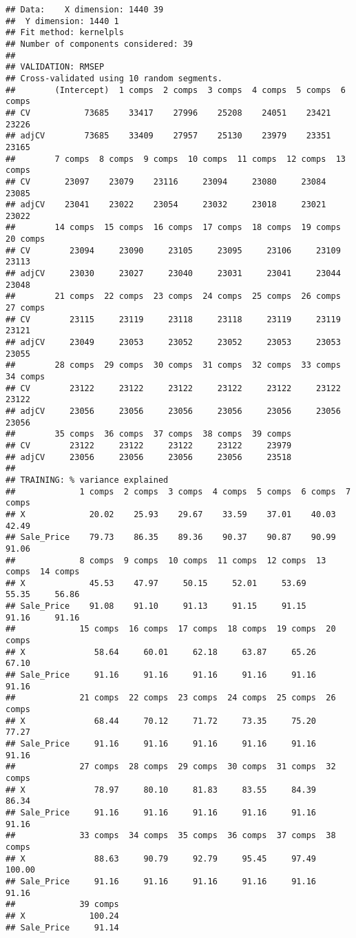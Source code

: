 \documentclass[
]{article}
\begin{document}
\begin{verbatim}
## Data:    X dimension: 1440 39 
##  Y dimension: 1440 1
## Fit method: kernelpls
## Number of components considered: 39
## 
## VALIDATION: RMSEP
## Cross-validated using 10 random segments.
##        (Intercept)  1 comps  2 comps  3 comps  4 comps  5 comps  6 comps
## CV           73685    33417    27996    25208    24051    23421    23226
## adjCV        73685    33409    27957    25130    23979    23351    23165
##        7 comps  8 comps  9 comps  10 comps  11 comps  12 comps  13 comps
## CV       23097    23079    23116     23094     23080     23084     23085
## adjCV    23041    23022    23054     23032     23018     23021     23022
##        14 comps  15 comps  16 comps  17 comps  18 comps  19 comps  20 comps
## CV        23094     23090     23105     23095     23106     23109     23113
## adjCV     23030     23027     23040     23031     23041     23044     23048
##        21 comps  22 comps  23 comps  24 comps  25 comps  26 comps  27 comps
## CV        23115     23119     23118     23118     23119     23119     23121
## adjCV     23049     23053     23052     23052     23053     23053     23055
##        28 comps  29 comps  30 comps  31 comps  32 comps  33 comps  34 comps
## CV        23122     23122     23122     23122     23122     23122     23122
## adjCV     23056     23056     23056     23056     23056     23056     23056
##        35 comps  36 comps  37 comps  38 comps  39 comps
## CV        23122     23122     23122     23122     23979
## adjCV     23056     23056     23056     23056     23518
## 
## TRAINING: % variance explained
##             1 comps  2 comps  3 comps  4 comps  5 comps  6 comps  7 comps
## X             20.02    25.93    29.67    33.59    37.01    40.03    42.49
## Sale_Price    79.73    86.35    89.36    90.37    90.87    90.99    91.06
##             8 comps  9 comps  10 comps  11 comps  12 comps  13 comps  14 comps
## X             45.53    47.97     50.15     52.01     53.69     55.35     56.86
## Sale_Price    91.08    91.10     91.13     91.15     91.15     91.16     91.16
##             15 comps  16 comps  17 comps  18 comps  19 comps  20 comps
## X              58.64     60.01     62.18     63.87     65.26     67.10
## Sale_Price     91.16     91.16     91.16     91.16     91.16     91.16
##             21 comps  22 comps  23 comps  24 comps  25 comps  26 comps
## X              68.44     70.12     71.72     73.35     75.20     77.27
## Sale_Price     91.16     91.16     91.16     91.16     91.16     91.16
##             27 comps  28 comps  29 comps  30 comps  31 comps  32 comps
## X              78.97     80.10     81.83     83.55     84.39     86.34
## Sale_Price     91.16     91.16     91.16     91.16     91.16     91.16
##             33 comps  34 comps  35 comps  36 comps  37 comps  38 comps
## X              88.63     90.79     92.79     95.45     97.49    100.00
## Sale_Price     91.16     91.16     91.16     91.16     91.16     91.16
##             39 comps
## X             100.24
## Sale_Price     91.14
\end{verbatim}
\end{document}
